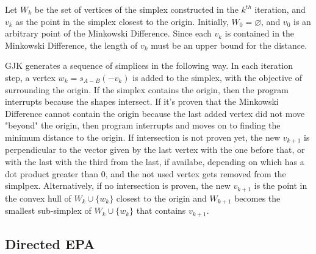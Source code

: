 \par Let $W_k$ be the set of vertices of the simplex constructed in the $k^{th}$ iteration, and $v_k$ as the point in the simplex closest to the origin. Initially, $W_0=\varnothing$, and $v_0$ is an arbitrary point of the Minkowski Difference. Since each $v_k$ is contained in the Minkowski Difference, the length of $v_k$ must be an upper bound for the distance.
\par \ac{GJK} generates a sequence of simplices in the following way. In each iteration step, a vertex $w_k = s_{A-B}(-v_k)$ is added to the simplex, with the objective of surrounding the origin. If the simplex contains the origin, then the program interrupts because the shapes intersect. If it's proven that the Minkowski Difference cannot contain the origin because the last added vertex did not move "beyond" the origin, then program interrupts and moves on to finding the minimum distance to the origin. If intersection is not proven yet, the new $v_{k+1}$ is perpendicular to the vector given by the last vertex with the one before that, or with the last with the third from the last, if availabe, depending on which has a dot product greater than 0, and the not used vertex gets removed from the simplpex. Alternatively, if no intersection is proven, the new $v_{k+1}$ is the point in the convex hull of $W_k\cup \{w_k\}$ closest to the origin and $W_{k+1}$ becomes the smallest sub-simplex of $W_k\cup \{w_k\}$ that contains $v_{k+1}$.


\subsection{Directed EPA}
\label{sec:epaalg}


